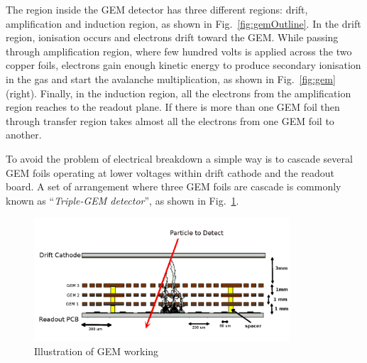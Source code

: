 The region inside the GEM detector has three different regions: drift, amplification and induction region, as shown in Fig.~\ref{fig:gemOutline}.
In the drift region, ionisation occurs and electrons drift toward the GEM. 
While passing through amplification region, where few hundred volts is applied across the two copper foils, electrons gain enough kinetic energy to produce secondary ionisation in the gas and start the avalanche multiplication, as shown in Fig.~\ref{fig:gem}(right).
Finally, in the induction region, all the electrons from the amplification region reaches to the readout plane. 
If there is more than one GEM foil then through transfer region takes almost all the electrons from one GEM foil to another.

To avoid the problem of electrical breakdown a simple way is to cascade several GEM foils operating at lower voltages within drift cathode and the readout board.
A set of arrangement where three GEM foils are cascade is commonly known as ``\textit{Triple-GEM detector}'', as shown in Fig.~\ref{fig:gemgaps}.
\begin{figure}[!htbp]
    \begin{center}
        \includegraphics[width=0.85\textwidth]{figures/GEM/triple_gem.png}
        \caption{Illustration of GEM working}
        \label{fig:gemgaps}
    \end{center}
\end{figure} 

